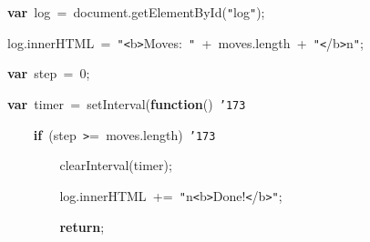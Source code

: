 \documentclass[a4paper,10pt]{article}
\def\mc{\relax}
\begin{document}
\noindent
\mbox{}\hfill

\noindent
\mbox{}{\tt\mc \ }{\tt\mc \ }{\tt\mc \ }{\tt\mc \ }{\tt\mc \ }{\tt\mc \ }{\tt\mc \ }{\tt\mc \ }{\tt\mc \ }{\tt\mc \ }{\tt\mc \ }{\tt\mc \ }\textbf{var}{\tt\mc \ }log{\tt\mc \ }={\tt\mc \ }document.getElementById({\tt "}log{\tt "});

\noindent
\mbox{}{\tt\mc \ }{\tt\mc \ }{\tt\mc \ }{\tt\mc \ }{\tt\mc \ }{\tt\mc \ }{\tt\mc \ }{\tt\mc \ }{\tt\mc \ }{\tt\mc \ }{\tt\mc \ }{\tt\mc \ }log.innerHTML{\tt\mc \ }={\tt\mc \ }{\tt "}{\tt <}b{\tt >}Moves:{\tt\mc \ }{\tt "}{\tt\mc \ }+{\tt\mc \ }moves.length{\tt\mc \ }+{\tt\mc \ }{\tt "}{\tt <}/b{\tt >}{\tt{}}n{\tt "};

\noindent
\mbox{}\hfill

\noindent
\mbox{}{\tt\mc \ }{\tt\mc \ }{\tt\mc \ }{\tt\mc \ }{\tt\mc \ }{\tt\mc \ }{\tt\mc \ }{\tt\mc \ }{\tt\mc \ }{\tt\mc \ }{\tt\mc \ }{\tt\mc \ }\textbf{var}{\tt\mc \ }step{\tt\mc \ }={\tt\mc \ }0;

\noindent
\mbox{}{\tt\mc \ }{\tt\mc \ }{\tt\mc \ }{\tt\mc \ }{\tt\mc \ }{\tt\mc \ }{\tt\mc \ }{\tt\mc \ }{\tt\mc \ }{\tt\mc \ }{\tt\mc \ }{\tt\mc \ }\textbf{var}{\tt\mc \ }timer{\tt\mc \ }={\tt\mc \ }setInterval(\textbf{function}(){\tt\mc \ }{\tt\char'173}

\noindent
\mbox{}{\tt\mc \ }{\tt\mc \ }{\tt\mc \ }{\tt\mc \ }{\tt\mc \ }{\tt\mc \ }{\tt\mc \ }{\tt\mc \ }{\tt\mc \ }{\tt\mc \ }{\tt\mc \ }{\tt\mc \ }{\tt\mc \ }{\tt\mc \ }{\tt\mc \ }{\tt\mc \ }\textbf{if}{\tt\mc \ }(step{\tt\mc \ }{\tt >}={\tt\mc \ }moves.length){\tt\mc \ }{\tt\char'173}

\noindent
\mbox{}{\tt\mc \ }{\tt\mc \ }{\tt\mc \ }{\tt\mc \ }{\tt\mc \ }{\tt\mc \ }{\tt\mc \ }{\tt\mc \ }{\tt\mc \ }{\tt\mc \ }{\tt\mc \ }{\tt\mc \ }{\tt\mc \ }{\tt\mc \ }{\tt\mc \ }{\tt\mc \ }{\tt\mc \ }{\tt\mc \ }{\tt\mc \ }{\tt\mc \ }clearInterval(timer);

\noindent
\mbox{}{\tt\mc \ }{\tt\mc \ }{\tt\mc \ }{\tt\mc \ }{\tt\mc \ }{\tt\mc \ }{\tt\mc \ }{\tt\mc \ }{\tt\mc \ }{\tt\mc \ }{\tt\mc \ }{\tt\mc \ }{\tt\mc \ }{\tt\mc \ }{\tt\mc \ }{\tt\mc \ }{\tt\mc \ }{\tt\mc \ }{\tt\mc \ }{\tt\mc \ }log.innerHTML{\tt\mc \ }+={\tt\mc \ }{\tt "}{\tt{}}n{\tt <}b{\tt >}Done!{\tt <}/b{\tt >}{\tt "};

\noindent
\mbox{}{\tt\mc \ }{\tt\mc \ }{\tt\mc \ }{\tt\mc \ }{\tt\mc \ }{\tt\mc \ }{\tt\mc \ }{\tt\mc \ }{\tt\mc \ }{\tt\mc \ }{\tt\mc \ }{\tt\mc \ }{\tt\mc \ }{\tt\mc \ }{\tt\mc \ }{\tt\mc \ }{\tt\mc \ }{\tt\mc \ }{\tt\mc \ }{\tt\mc \ }\textbf{return};
\end{document}
